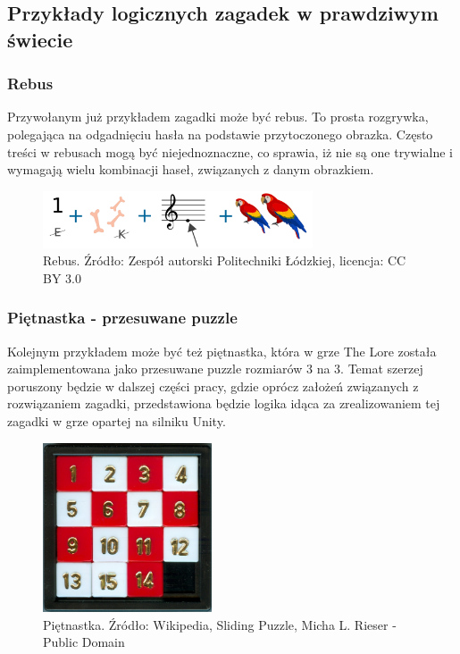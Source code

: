 \documentclass[oneside,polski,logo]{amuthesis}
\begin{document}
\subsection{Przykłady logicznych zagadek w prawdziwym świecie}
\subsubsection{Rebus}
Przywołanym już przykładem zagadki może być rebus. To prosta rozgrywka, polegająca na odgadnięciu hasła na podstawie przytoczonego obrazka. Często treści w rebusach mogą być niejednoznaczne, co sprawia, iż nie są one trywialne i wymagają wielu kombinacji haseł, związanych z danym obrazkiem. \cite{rebus}
\begin{figure}[h]
	\centering
	\includegraphics[width=8cm]{images/tyrek/rebus.png}
	\caption{Rebus. Źródło: Zespół autorski Politechniki Łódzkiej, licencja: CC BY 3.0}
\end{figure}

\subsubsection{Piętnastka - przesuwane puzzle}
Kolejnym przykładem może być też piętnastka, która w grze The Lore została zaimplementowana jako przesuwane puzzle rozmiarów 3 na 3. Temat szerzej poruszony będzie w dalszej części pracy, gdzie oprócz założeń związanych z rozwiązaniem zagadki, przedstawiona będzie logika idąca za zrealizowaniem tej zagadki w grze opartej na silniku Unity. 
\begin{figure}[h]
	\centering
	\includegraphics[width=5cm]{images/tyrek/przesuwane-puzzle.jpg}
	\caption{Piętnastka. Źródło: Wikipedia, Sliding Puzzle, Micha L. Rieser - Public Domain}
\end{figure}
\end{document}
